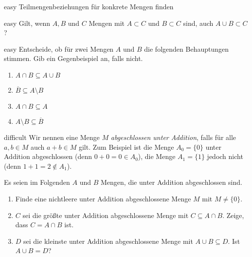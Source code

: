 \documentclass[../abbildungen.tex]{subfiles}
\begin{document}
\begin{exercise}{easy}
    Teilmengenbeziehungen für konkrete Mengen finden
\end{exercise}

\begin{exercise}{easy}
    Gilt, wenn $A,B$ und $C$ Mengen mit $A\subset C$ und $B\subset C$ sind, auch $A\cup B\subset C$?
\end{exercise}

\begin{exercise}{easy}
    Entscheide, ob für zwei Mengen $A$ und $B$ die folgenden Behauptungen stimmen. Gib ein Gegenbeispiel an, falls nicht.
    \begin{multicols}{4}
        \begin{enumerate}
            \item $A\cap B\subseteq A\cup B$
            \item $\overline{B}\subseteq A\setminus B$
            \item $A\cap B\subseteq A$
            \item $A\setminus B\subseteq \overline{B}$
        \end{enumerate}
    \end{multicols}
\end{exercise}

\begin{exercise}{difficult}
    Wir nennen eine Menge $M$ \emph{abgeschlossen unter Addition}, falls für alle $a,b\in M$ auch $a+b\in M$ gilt. Zum Beispiel ist die Menge $A_0=\{0\}$ unter Addition abgeschlossen (denn $0+0=0\in A_0$), die Menge $A_1=\{1\}$ jedoch nicht (denn $1+1=2\notin A_1$).
    
    Es seien im Folgenden $A$ und $B$ Mengen, die unter Addition abgeschlossen sind.

    \begin{enumerate}
        \item Finde eine nichtleere unter Addition abgeschlossene Menge $M$ mit $M\neq \{0\}$.
        \item $C$ sei die größte unter Addition abgeschlossene Menge mit $C\subseteq A\cap B$. Zeige, dass $C=A\cap B$ ist.
        \item $D$ sei die kleinste unter Addition abgeschlossene Menge mit $A\cup B\subseteq D$. Ist $A\cup B=D$?
    \end{enumerate}
\end{exercise}
\end{document}
